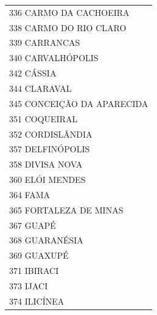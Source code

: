 \documentclass{article}
\begin{document}
\begin{longtable}[c]{m{18cm}}
\multicolumn{1}{l}{ \hspace{2em} 336 CARMO DA CACHOEIRA } \\
\multicolumn{1}{l}{ \hspace{2em} 338 CARMO DO RIO CLARO } \\
\multicolumn{1}{l}{ \hspace{2em} 339 CARRANCAS } \\
\multicolumn{1}{l}{ \hspace{2em} 340 CARVALHÓPOLIS } \\
\multicolumn{1}{l}{ \hspace{2em} 342 CÁSSIA } \\
\multicolumn{1}{l}{ \hspace{2em} 344 CLARAVAL } \\
\multicolumn{1}{l}{ \hspace{2em} 345 CONCEIÇÃO DA APARECIDA } \\
\multicolumn{1}{l}{ \hspace{2em} 351 COQUEIRAL } \\
\multicolumn{1}{l}{ \hspace{2em} 352 CORDISLÂNDIA } \\
\multicolumn{1}{l}{ \hspace{2em} 357 DELFINÓPOLIS } \\
\multicolumn{1}{l}{ \hspace{2em} 358 DIVISA NOVA } \\
\multicolumn{1}{l}{ \hspace{2em} 360 ELÓI MENDES } \\
\multicolumn{1}{l}{ \hspace{2em} 364 FAMA } \\
\multicolumn{1}{l}{ \hspace{2em} 365 FORTALEZA DE MINAS } \\
\multicolumn{1}{l}{ \hspace{2em} 367 GUAPÉ } \\
\multicolumn{1}{l}{ \hspace{2em} 368 GUARANÉSIA } \\
\multicolumn{1}{l}{ \hspace{2em} 369 GUAXUPÉ } \\
\multicolumn{1}{l}{ \hspace{2em} 371 IBIRACI } \\
\multicolumn{1}{l}{ \hspace{2em} 373 IJACI } \\
\multicolumn{1}{l}{ \hspace{2em} 374 ILICÍNEA } \\

\end{longtable}
\end{document}
